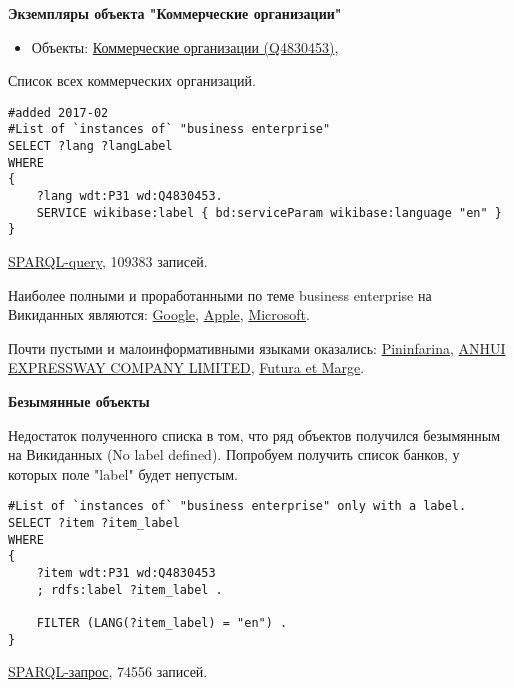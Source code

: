 \textbf{Экземпляры объекта "Коммерческие организации"}

\begin{itemize}
    \item Объекты: \href{https://www.wikidata.org/wiki/Q4830453}{Коммерческие организации (Q4830453)},
\end{itemize}

Список всех коммерческих организаций.

\begin{lstlisting}[language=SPARQL]
#added 2017-02
#List of `instances of` "business enterprise" 
SELECT ?lang ?langLabel
WHERE
{
    ?lang wdt:P31 wd:Q4830453.
    SERVICE wikibase:label { bd:serviceParam wikibase:language "en" }
}
\end{lstlisting}

\href{https://query.wikidata.org/#%23List%20of%20%60instances%20of%60%20%22business%20enterprise%22%20%0ASELECT%20%3Flang%20%3FlangLabel%0AWHERE%0A%7B%0A%20%20%20%20%3Flang%20wdt%3AP31%20wd%3AQ4830453.%0A%20%20%20%20SERVICE%20wikibase%3Alabel%20%7B%20bd%3AserviceParam%20wikibase%3Alanguage%20%22en%22%20%7D%0A%7D}{SPARQL-query}, 109383 записей.

Наиболее полными и проработанными по теме business enterprise на Викиданных являются:
\href{https://www.wikidata.org/wiki/Q95}{Google}, 
\href{https://www.wikidata.org/wiki/Q312}{Apple},
\href{https://www.wikidata.org/wiki/Q2283}{Microsoft}.

Почти пустыми и малоинформативными языками оказались:
\href{https://www.wikidata.org/wiki/Q40987}{Pininfarina},
\href{https://www.wikidata.org/wiki/Q46065}{ANHUI EXPRESSWAY COMPANY LIMITED},
\href{https://www.wikidata.org/wiki/Q45812}{Futura et Marge}.

\textbf{Безымянные объекты}

Недостаток полученного списка в том, что ряд объектов получился безымянным на Викиданных (No label defined). Попробуем получить список банков, у которых поле "label" будет непустым. 

\begin{lstlisting}[language=SPARQL]
#List of `instances of` "business enterprise" only with a label.
SELECT ?item ?item_label
WHERE
{
    ?item wdt:P31 wd:Q4830453
    ; rdfs:label ?item_label . 

    FILTER (LANG(?item_label) = "en") . 
}
\end{lstlisting}

\href{https://query.wikidata.org/#SELECT%20%3Fitem%20%3Fitem_label%0AWHERE%0A%7B%0A%20%20%20%20%3Fitem%20wdt%3AP31%20wd%3AQ4830453%0A%20%20%20%20%3B%20rdfs%3Alabel%20%3Fitem_label%20.%20%0A%0A%20%20%20%20FILTER%20%28LANG%28%3Fitem_label%29%20%3D%20%22en%22%29%20.%20%0A%7D}{SPARQL-запрос}, 74556 записей.